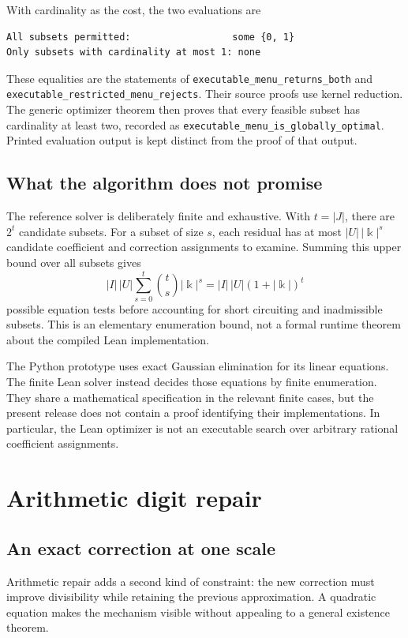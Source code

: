 \documentclass[11pt,letterpaper,oneside,openany]{book}
\theoremstyle{quiet}
\newcommand{\kk}{\Bbbk}
\newcommand{\decl}[1]{{\small\nolinkurl{#1}}}
\begin{document}
With cardinality as the cost, the two evaluations are
\begin{Verbatim}[fontsize=\small,frame=single,framesep=8pt,rulecolor=\color{RuleGray}]
All subsets permitted:                  some {0, 1}
Only subsets with cardinality at most 1: none
\end{Verbatim}
These equalities are the statements of
\decl{executable_menu_returns_both} and
\decl{executable_restricted_menu_rejects}. Their source proofs use kernel reduction. The generic optimizer theorem then proves that every feasible subset has cardinality at least two, recorded as \decl{executable_menu_is_globally_optimal}. Printed evaluation output is kept distinct from the proof of that output.

\section{What the algorithm does not promise}
The reference solver is deliberately finite and exhaustive. With $t=|J|$, there are $2^t$ candidate subsets. For a subset of size $s$, each residual has at most $|U|\,|\kk|^s$ candidate coefficient and correction assignments to examine. Summing this upper bound over all subsets gives
\[
|I|\,|U|\sum_{s=0}^t\binom ts|\kk|^s
=|I|\,|U|(1+|\kk|)^t
\]
possible equation tests before accounting for short circuiting and inadmissible subsets. This is an elementary enumeration bound, not a formal runtime theorem about the compiled Lean implementation.

The Python prototype uses exact Gaussian elimination for its linear equations. The finite Lean solver instead decides those equations by finite enumeration. They share a mathematical specification in the relevant finite cases, but the present release does not contain a proof identifying their implementations. In particular, the Lean optimizer is not an executable search over arbitrary rational coefficient assignments.

\chapter{Arithmetic digit repair}\label{ch:arithmetic}
\section{An exact correction at one scale}
Arithmetic repair adds a second kind of constraint: the new correction must improve divisibility while retaining the previous approximation. A quadratic equation makes the mechanism visible without appealing to a general existence theorem.
\end{document}
